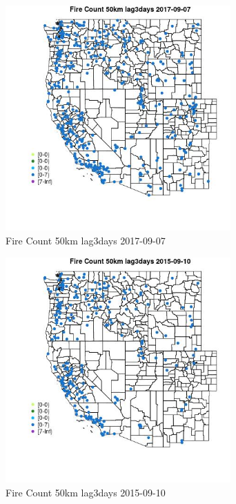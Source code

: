 \begin{figure} 
\centering  
\includegraphics[width=0.77\textwidth]{Code_Outputs/Report_ML_input_PM25_Step4_part_e_de_duplicated_aves_compiled_2019-05-21wNAs_MapObsFire_Count_50km_lag3days2017-09-07.jpg} 
\caption{\label{fig:Report_ML_input_PM25_Step4_part_e_de_duplicated_aves_compiled_2019-05-21wNAsMapObsFire_Count_50km_lag3days2017-09-07}Fire Count 50km lag3days 2017-09-07} 
\end{figure} 
 

\begin{figure} 
\centering  
\includegraphics[width=0.77\textwidth]{Code_Outputs/Report_ML_input_PM25_Step4_part_e_de_duplicated_aves_compiled_2019-05-21wNAs_MapObsFire_Count_50km_lag3days2015-09-10.jpg} 
\caption{\label{fig:Report_ML_input_PM25_Step4_part_e_de_duplicated_aves_compiled_2019-05-21wNAsMapObsFire_Count_50km_lag3days2015-09-10}Fire Count 50km lag3days 2015-09-10} 
\end{figure} 
 

